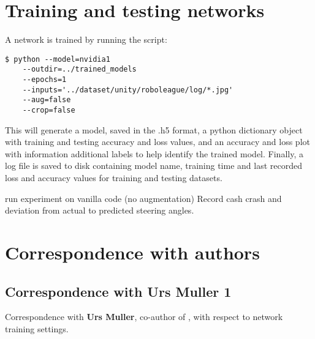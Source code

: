 \section{Training and testing networks}
A network is trained by running the script:
\begin{verbatim}
$ python --model=nvidia1
    --outdir=../trained_models
    --epochs=1
    --inputs='../dataset/unity/roboleague/log/*.jpg'
    --aug=false
    --crop=false    
\end{verbatim}
This will generate a model, saved in the .h5 format, a python dictionary object with training and testing accuracy and loss values, and an accuracy and loss plot with information additional labels to help identify the trained model. Finally, a log file is saved to disk containing model name, training time and last recorded loss and accuracy values for training and testing datasets.

run experiment on vanilla code (no augmentation)
Record cash crash and deviation from actual to predicted steering angles.

\section{Correspondence with authors}
\label{corr_with_authors}

\subsection{Correspondence with Urs Muller 1}
\label{urs_muller1}
Correspondence with \textbf{Urs Muller}, co-author of \cite{bojarski2016end}, with respect to network training settings.

